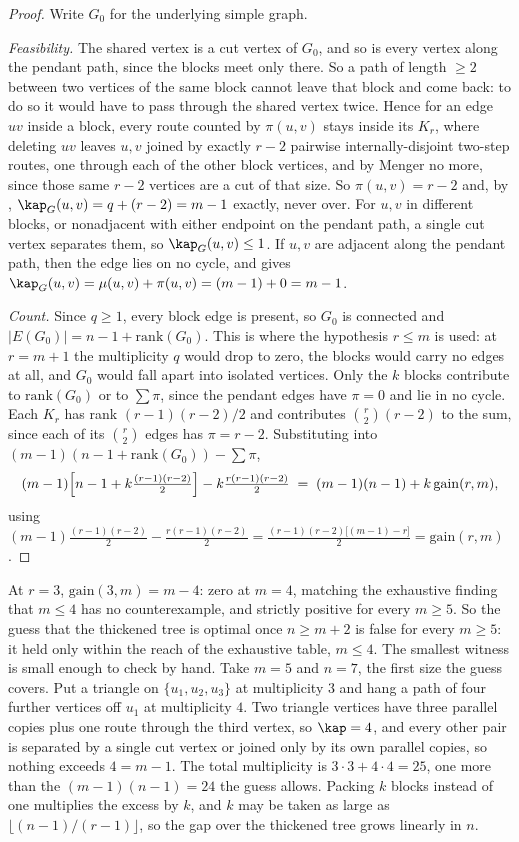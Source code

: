 \begin{proof}
Write $G_0$ for the underlying simple graph.

\emph{Feasibility.} The shared vertex is a cut vertex of $G_0$, and so is every vertex along the pendant path, since the blocks meet only there. So a path of length $\ge 2$ between two vertices of the same block cannot leave that block and come back: to do so it would have to pass through the shared vertex twice. Hence for an edge $uv$ inside a block, every route counted by $\pi(u,v)$ stays inside its $K_r$, where deleting $uv$ leaves $u,v$ joined by exactly $r-2$ pairwise internally-disjoint two-step routes, one through each of the other block vertices, and by Menger no more, since those same $r-2$ vertices are a cut of that size. So $\pi(u,v) = r-2$ and, by , $\kap_G(u,v) = q + (r-2) = m-1$ exactly, never over. For $u,v$ in different blocks, or nonadjacent with either endpoint on the pendant path, a single cut vertex separates them, so $\kap_G(u,v) \le 1$. If $u,v$ are adjacent along the pendant path, then the edge lies on no cycle, and  gives $\kap_G(u,v)=\mu(u,v)+\pi(u,v)=(m-1)+0=m-1$.

\emph{Count.} Since $q \ge 1$, every block edge is present, so $G_0$ is connected and $|E(G_0)| = n - 1 + \mathrm{rank}(G_0)$. This is where the hypothesis $r \le m$ is used: at $r = m+1$ the multiplicity $q$ would drop to zero, the blocks would carry no edges at all, and $G_0$ would fall apart into isolated vertices. Only the $k$ blocks contribute to $\mathrm{rank}(G_0)$ or to $\sum \pi$, since the pendant edges have $\pi = 0$ and lie in no cycle. Each $K_r$ has rank $(r-1)(r-2)/2$ and contributes $\binom{r}{2}(r-2)$ to the sum, since each of its $\binom{r}{2}$ edges has $\pi = r-2$. Substituting into $(m-1)(n-1+\mathrm{rank}(G_0)) - \sum \pi$,
\[
    (m-1)\Bigl[n-1+k\tfrac{(r-1)(r-2)}{2}\Bigr] - k\tfrac{r(r-1)(r-2)}{2}
    \;=\; (m-1)(n-1) + k\,\mathrm{gain}(r,m),
\]
using $(m-1)\tfrac{(r-1)(r-2)}{2} - \tfrac{r(r-1)(r-2)}{2} = \tfrac{(r-1)(r-2)\bigl[(m-1)-r\bigr]}{2} = \mathrm{gain}(r,m)$.
\end{proof}

At $r = 3$, $\mathrm{gain}(3,m) = m-4$: zero at $m = 4$, matching the exhaustive finding that $m \le 4$ has no counterexample, and strictly positive for every $m \ge 5$. So the guess that the thickened tree is optimal once $n \ge m+2$ is false for every $m \ge 5$: it held only within the reach of the exhaustive table, $m \le 4$. The smallest witness is small enough to check by hand. Take $m = 5$ and $n = 7$, the first size the guess covers. Put a triangle on $\{u_1, u_2, u_3\}$ at multiplicity $3$ and hang a path of four further vertices off $u_1$ at multiplicity $4$. Two triangle vertices have three parallel copies plus one route through the third vertex, so $\kap = 4$, and every other pair is separated by a single cut vertex or joined only by its own parallel copies, so nothing exceeds $4 = m-1$. The total multiplicity is $3 \cdot 3 + 4 \cdot 4 = 25$, one more than the $(m-1)(n-1) = 24$ the guess allows. Packing $k$ blocks instead of one multiplies the excess by $k$, and $k$ may be taken as large as $\lfloor (n-1)/(r-1) \rfloor$, so the gap over the thickened tree grows linearly in $n$.

